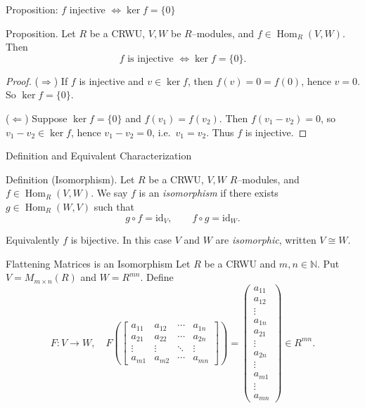 \documentclass[11pt,aspectratio=43,ignorenonframetext,t]{beamer}
\begin{document}
\begin{frame}{Proposition: $f$ injective $\iff \ker f=\{0\}$}
\begin{block}{Proposition.}
Let $R$ be a CRWU, $V,W$ be $R$–modules, and $f\in\operatorname{Hom}_R(V,W)$. Then
\[
f \text{ is injective } \iff \ker f=\{0\}.
\]
\end{block}

\begin{proof}
($\Rightarrow$) If $f$ is injective and $v\in\ker f$, then $f(v)=0=f(0)$, hence $v=0$. So $\ker f=\{0\}$.

($\Leftarrow$) Suppose $\ker f=\{0\}$ and $f(v_1)=f(v_2)$. Then $f(v_1-v_2)=0$, so $v_1-v_2\in\ker f$, hence $v_1-v_2=0$, i.e.\ $v_1=v_2$. Thus $f$ is injective.
\end{proof}
\end{frame}


\begin{frame}{Definition and Equivalent Characterization}
\begin{block}{Definition (Isomorphism).}
Let $R$ be a CRWU, $V,W$ $R$–modules, and $f\in\operatorname{Hom}_R(V,W)$. We say $f$ is an \emph{isomorphism} if there exists $g\in\operatorname{Hom}_R(W,V)$ such that
\[
g\circ f=\mathrm{id}_V,\qquad f\circ g=\mathrm{id}_W.
\]
\end{block}
\begin{block}{Equivalently}
$f$ is bijective. In this case $V$ and $W$ are \emph{isomorphic}, written $V\cong W$.
\end{block}
\end{frame}

\begin{frame}{Flattening Matrices is an Isomorphism}
Let $R$ be a CRWU and $m,n\in\mathbb{N}$. Put $V=M_{m\times n}(R)$ and $W=R^{mn}$. Define
\[
F:V\to W,\quad
F\!\left(\begin{bmatrix}
a_{11} & a_{12} & \cdots & a_{1n}\\
a_{21} & a_{22} & \cdots & a_{2n}\\
\vdots & \vdots & \ddots & \vdots\\
a_{m1} & a_{m2} & \cdots & a_{mn}
\end{bmatrix}\right)
=
\begin{pmatrix}
a_{11}\\ a_{12}\\ \vdots\\ a_{1n}\\ a_{21}\\ \vdots\\ a_{2n}\\ \vdots\\ a_{m1}\\ \vdots\\ a_{mn}
\end{pmatrix}
\in R^{mn}.
\]
\end{frame}
\end{document}

